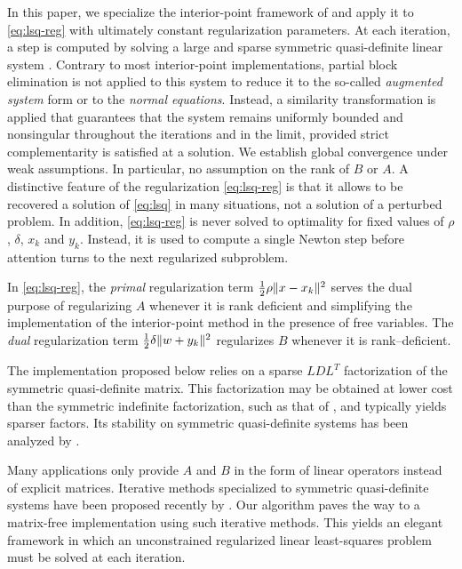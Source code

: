 \documentclass{amsart}
\begin{document}
In this paper, we specialize the interior-point framework of
\cite{friedlander-orban-2012} and apply it to \eqref{eq:lsq-reg} with
ultimately constant regularization parameters. At each iteration, a step is
computed by solving a large and sparse symmetric quasi-definite linear system
\citep{vanderbei-1995}. Contrary to most interior-point implementations,
partial block elimination is not applied to this system to reduce it to the
so-called \textit{augmented system} form or to the \textit{normal equations}.
Instead, a similarity transformation is applied that guarantees that the system
remains uniformly bounded and nonsingular throughout the iterations and in the
limit,  provided strict complementarity is satisfied at a solution. We establish
global convergence under weak assumptions. In particular, no assumption on the
rank of $B$ or $A$. A distinctive feature of the regularization
\eqref{eq:lsq-reg} is that it allows to be recovered a solution of \eqref{eq:lsq} in
many situations,  not a solution of a perturbed problem. In addition,
\eqref{eq:lsq-reg} is never solved to optimality for fixed values of $\rho$,
$\delta$, $x_k$ and $y_k$. Instead, it is used to compute a single Newton step
before attention turns to the next regularized subproblem.

In \eqref{eq:lsq-reg}, the \textit{primal} regularization term $\tfrac{1}{2}
\rho \|x - x_k\|^2$ serves the dual purpose of regularizing $A$ whenever it
is rank deficient and simplifying the implementation of the interior-point
method in the presence of free variables. The \textit{dual} regularization term
$\tfrac{1}{2} \delta \|w + y_k\|^2$ regularizes $B$ whenever it is rank--deficient.

The implementation proposed below relies on a sparse $LDL^T$ factorization
of the symmetric quasi-definite  matrix. This factorization may be
obtained at lower cost than the symmetric indefinite factorization, such as
that of \cite{duff-2004}, and typically yields sparser factors. Its stability
on symmetric quasi-definite systems has been analyzed by
\cite{gill-saunders-shinnerl-1996}.

Many applications only provide $A$ and $B$ in the form of linear operators
instead of explicit matrices. Iterative methods specialized to symmetric
quasi-definite systems have been  proposed recently by \cite{arioli-orban-2012}.
Our algorithm paves the way to a matrix-free implementation using such iterative
methods. This yields an elegant framework in which an unconstrained
regularized linear least-squares problem must be solved at each iteration.
\end{document}
